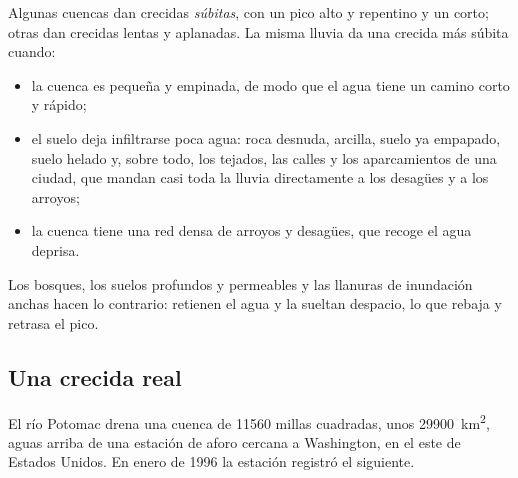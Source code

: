 Algunas cuencas dan crecidas \emph{súbitas}, con un pico alto y repentino y
un  corto; otras dan crecidas lentas y aplanadas. La misma
lluvia da una crecida más súbita cuando:
\begin{itemize}
  \item la cuenca es pequeña y empinada, de modo que el agua tiene un camino
        corto y rápido;
  \item el suelo deja infiltrarse poca agua: roca desnuda, arcilla, suelo ya
        empapado, suelo helado y, sobre todo, los tejados, las calles y los
        aparcamientos de una ciudad, que mandan casi toda la lluvia
        directamente a los desagües y a los arroyos;
  \item la cuenca tiene una red densa de arroyos y desagües, que recoge el
        agua deprisa.
\end{itemize}
Los bosques, los suelos profundos y permeables y las llanuras de inundación
anchas hacen lo contrario: retienen el agua y la sueltan despacio, lo que
rebaja y retrasa el pico.

\subsection*{Una crecida real}

El río Potomac drena una cuenca de \num{11560} millas cuadradas, unos
\qty{29900}{km^2}, aguas arriba de una estación de aforo cercana a
Washington, en el este de Estados Unidos. En enero de 1996 la estación
registró el  siguiente.


